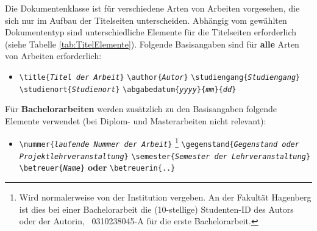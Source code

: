 Die Dokumentenklasse ist für verschiedene Arten von Arbeiten vorgesehen, die sich nur im Aufbau 
der Titelseiten unterscheiden. 
Abhängig vom gewählten Dokumententyp sind unterschiedliche Elemente für die Titelseiten erforderlich (siehe Tabelle \ref{tab:TitelElemente}).
Folgende Basisangaben sind für \textbf{alle} Arten von Arbeiten
erforderlich:
%
\begin{itemize}
\item[] %
\verb!\title{!\texttt{\em Titel der Arbeit}\verb!}! \newline%
\verb!\author{!\texttt{\em Autor}\verb!}! \newline%
\verb!\studiengang{!\texttt{\em Studiengang}\verb!}! \newline%
\verb!\studienort{!\texttt{\em Studienort}\verb!}! \newline%
\verb!\abgabedatum{!\texttt{\em yyyy}\verb!}{!\texttt{\em mm}\verb!}{!\texttt{\em dd}\verb!}!
\end{itemize}
%
\noindent Für \textbf{Bachelorarbeiten} werden zusätzlich zu den Basisangaben folgende Elemente verwendet (bei Diplom- und Masterarbeiten nicht relevant):
%
\begin{itemize}
\item[] \verb!\nummer{!\texttt{\em laufende Nummer der Arbeit}\verb!}!%
\footnote{Wird normalerweise von der Institution vergeben. An der
Fakultät Hagenberg ist dies bei einer Bachelorarbeit die (10-stellige) Studenten-ID 
des Autors oder der Autorin,
\zB\ \textsf{0310238045-A} für die erste Bachelorarbeit.} \newline%
\verb!\gegenstand{!\texttt{\em Gegenstand oder Projektlehrveranstaltung}\verb!}! \newline%
\verb!\semester{!\texttt{\em Semester der Lehrveranstaltung}\verb!}! \newline%
\verb!\betreuer{!\texttt{\em Name}\verb!}! \textbf{oder}
\verb!\betreuerin{..}!
\end{itemize}

